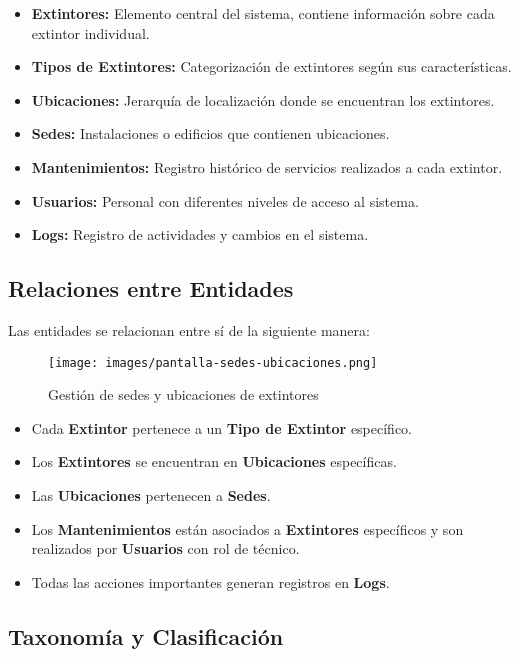 \documentclass[11pt,a4paper]{article}
\begin{document}
\begin{itemize}
    \item \textbf{Extintores:} Elemento central del sistema, contiene información sobre cada extintor individual.
    \item \textbf{Tipos de Extintores:} Categorización de extintores según sus características.
    \item \textbf{Ubicaciones:} Jerarquía de localización donde se encuentran los extintores.
    \item \textbf{Sedes:} Instalaciones o edificios que contienen ubicaciones.
    \item \textbf{Mantenimientos:} Registro histórico de servicios realizados a cada extintor.
    \item \textbf{Usuarios:} Personal con diferentes niveles de acceso al sistema.
    \item \textbf{Logs:} Registro de actividades y cambios en el sistema.
\end{itemize}

\subsection{Relaciones entre Entidades}

Las entidades se relacionan entre sí de la siguiente manera:

\begin{figure}[h]
    \centering
    \texttt{[image: images/pantalla-sedes-ubicaciones.png]}
    \caption{Gestión de sedes y ubicaciones de extintores}
    \label{fig:sedes-ubicaciones}
\end{figure}

\begin{itemize}
    \item Cada \textbf{Extintor} pertenece a un \textbf{Tipo de Extintor} específico.
    \item Los \textbf{Extintores} se encuentran en \textbf{Ubicaciones} específicas.
    \item Las \textbf{Ubicaciones} pertenecen a \textbf{Sedes}.
    \item Los \textbf{Mantenimientos} están asociados a \textbf{Extintores} específicos y son realizados por \textbf{Usuarios} con rol de técnico.
    \item Todas las acciones importantes generan registros en \textbf{Logs}.
\end{itemize}

\subsection{Taxonomía y Clasificación}
\end{document}
